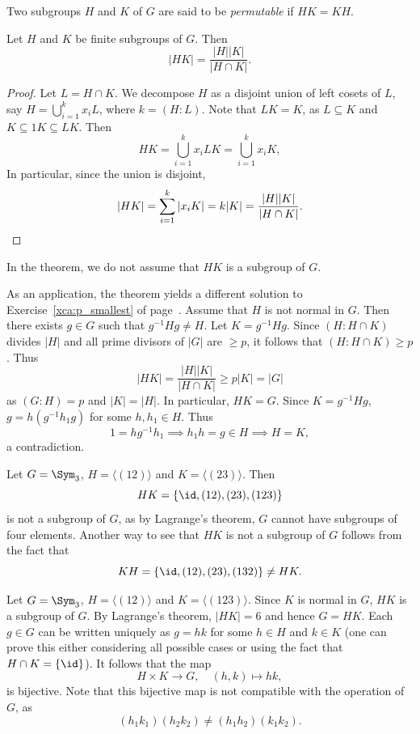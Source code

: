 Two subgroups $H$ and $K$ of $G$ are said to be
\emph{permutable} if $HK=KH$.

\begin{theorem}
\label{thm:|HK|}
    Let $H$ and $K$ be finite subgroups of $G$. 
    Then 
    \[
        |HK|=\frac{|H||K|}{|H\cap K|}.
    \]
\end{theorem}

\begin{proof}
Let $L=H\cap K$.
We decompose $H$ as a disjoint union of left cosets of $L$, say 
$H=\bigcup_{i=1}^k x_iL$, where $k=(H:L)$. Note that $LK=K$, as $L\subseteq K$ and $K\subseteq 1K\subseteq LK$.
Then
\[
HK=\bigcup_{i=1}^k x_iLK=\bigcup_{i=1}^k x_iK,
\]
In particular, since the union is disjoint, 
\[
|HK|=\sum_{i=1}^k |x_iK|=k|K|=\frac{|H||K|}{|H\cap K|}.\qedhere
\]
\end{proof}

In the theorem, we do not assume that $HK$ is a subgroup of $G$. 

\begin{optional}
As an application, the theorem yields a different solution to Exercise~\ref{xca:p_smallest} of page~\pageref{xca:p_smallest}. 
Assume that $H$ is not normal in $G$. Then 
there exists $g\in G$ such that 
$g^{-1}Hg\ne H$. Let $K=g^{-1}Hg$. Since $(H:H\cap K)$ divides $|H|$ 
and all prime divisors of $|G|$ 
are $\geq p$, it follows that $(H:H\cap K)\geq p$. Thus 
\[
|HK|=\frac{|H||K|}{|H\cap K|}\geq p|K|=|G|
\]
as $(G:H)=p$ and $|K|=|H|$. In particular, $HK=G$. Since $K=g^{-1}Hg$, 
$g=h(g^{-1}h_1g)$ for some $h,h_1\in H$. Thus 
\[
1=hg^{-1}h_1\implies h_1h=g\in H\implies H=K,
\]
a contradiction.
\end{optional}

\begin{example}
\label{exa:HKneKH}
Let $G=\Sym_3$, $H=\langle (12)\rangle$ and $K=\langle (23)\rangle$. Then 
\[
HK=\{\id,(12),(23),(123)\}
\]
is not a subgroup of $G$, as by Lagrange's theorem, 
$G$ cannot have subgroups of four elements. Another way 
to see that $HK$ is not a subgroup of $G$ follows from 
the fact that 
\[
KH=\{\id,(12),(23),(132)\}\ne HK.
\]
\end{example}

\begin{example}
\label{exa:anotherHK}
Let $G=\Sym_3$, $H=\langle (12)\rangle$ and $K=\langle (123)\rangle$.
Since $K$ is normal in $G$, $HK$ is a subgroup of $G$. By Lagrange's theorem, $|HK|=6$ and hence $G=HK$.
Each $g\in G$ can be written uniquely as $g=hk$ for some $h\in H$ and $k\in K$ (one can prove this either considering all possible cases or 
using the fact that $H\cap K=\{\id\}$). It follows that the map 
\[
H\times K\to G,\quad
(h,k)\mapsto hk,
\]
is bijective. Note that this bijective map is not compatible 
with the operation of $G$, as 
\[
(h_1k_1)(h_2k_2)\ne (h_1h_2)(k_1k_2).
\]
\end{example}


